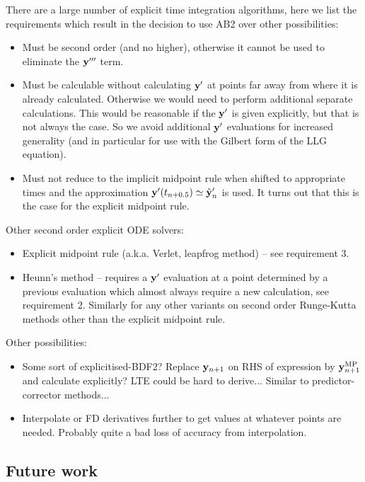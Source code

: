 There are a large number of explicit time integration algorithms, here we list the requirements which result in the decision to use AB2 over other possibilities:
\begin{itemize}
\item Must be second order (and no higher), otherwise it cannot be used to eliminate the $\mathbf{y}'''$ term.

\item Must be calculable without calculating $\mathbf{y}'$ at points far away from where it is already calculated.
  Otherwise we would need to perform additional separate calculations.
  This would be reasonable if the $\mathbf{y}'$ is given explicitly, but that is not always the case.
  So we avoid additional $\mathbf{y}'$ evaluations for increased generality (and in particular for use with the Gilbert form of the LLG equation).

\item Must not reduce to the implicit midpoint rule when shifted to appropriate times and the approximation $\mathbf{y}'(t_{n+ 0.5}) \simeq \hat{\mathbf{y}}_{n}'$ is used.
  It turns out that this is the case for the explicit midpoint rule.
\end{itemize}

Other second order explicit ODE solvers:
\begin{itemize}
\item Explicit midpoint rule (a.k.a. Verlet, leapfrog method) -- see requirement 3.
\item Heunn's method -- requires a $\mathbf{y}'$ evaluation at a point determined by a previous evaluation which almost always require a new calculation, see requirement 2. Similarly for any other variants on second order Runge-Kutta methods other than the explicit midpoint rule.
\end{itemize}


Other possibilities:
\begin{itemize}
\item Some sort of explicitised-BDF2? Replace $\mathbf{y}_{n+1}$ on RHS of expression by $\mathbf{y}_{n+1}^{\text{MP}}$ and calculate explicitly? LTE could be hard to derive... Similar to predictor-corrector methods...
\item Interpolate or FD derivatives further to get values at whatever points are needed. Probably quite a bad loss of accuracy from interpolation.
\end{itemize}

\subsection{Future work}




